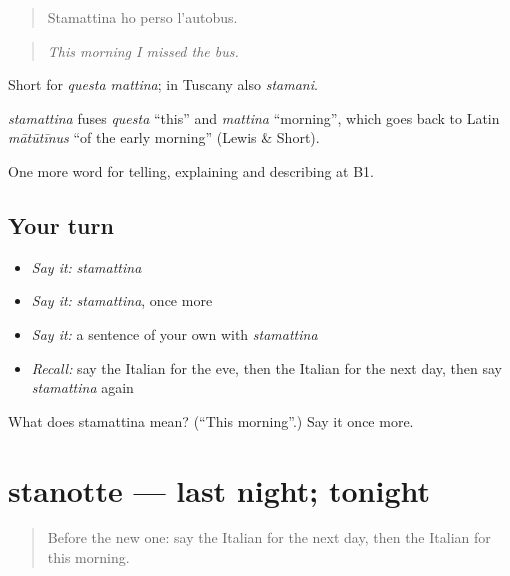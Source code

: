 \begin{quote}
Stamattina ho perso l'autobus.
\end{quote}

\begin{quote}
\emph{This morning I missed the bus.}
\end{quote}

Short for \emph{questa mattina}; in Tuscany also \emph{stamani}.

\begin{cousinweb}
\emph{stamattina} fuses \emph{questa} \textquotedblleft{}this\textquotedblright{} and \emph{mattina} \textquotedblleft{}morning\textquotedblright{}, which goes back to Latin \emph{mātūtīnus} \textquotedblleft{}of the early morning\textquotedblright{} (Lewis \& Short).
\end{cousinweb}

\begin{grammarlens}[title={What you've built}]
One more word for telling, explaining and describing at B1.
\end{grammarlens}

\subsection*{Your turn}
\begin{itemize}
\raggedright
  \item \emph{Say it:} \emph{stamattina}
  \item \emph{Say it:} \emph{stamattina}, once more
  \item \emph{Say it:} a sentence of your own with \emph{stamattina}
  \item \emph{Recall:} say the Italian for the eve, then the Italian for the next day, then say \emph{stamattina} again
\end{itemize}

\begin{tcolorbox}[breakable,colback=teal!4,colframe=teal!35!black,title={Before you move on}]
What does stamattina mean? (\textquotedblleft{}This morning\textquotedblright{}.) Say it once more.
\end{tcolorbox}
\section[stanotte]{stanotte — last night; tonight}

\label{lesson:IT-C281-stanotte}



\begin{quote}
Before the new one: say the Italian for the next day, then the Italian for this morning.
\end{quote}

